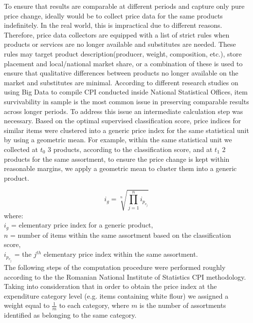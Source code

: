 \documentclass[]{article}
\begin{document}
To ensure that results are comparable at different periods and capture only pure price change, ideally would be to collect price data for the same products indefinitely. In the real world, this is impractical due to different reasons. Therefore, price data collectors are equipped with a list of strict rules when products or services are no longer available and substitutes are needed. These rules may target product description(producer, weight, composition, etc.), store placement and local/national market share, or a combination of these is used to ensure that qualitative differences between products no longer available on the market and substitutes are minimal. According to different research studies on using Big Data to compile CPI conducted inside National Statistical Offices, item survivability in sample is the most common issue in preserving comparable results across longer periods\cite{tranzitivity, kints}. To address this issue an intermediate calculation step was necessary. Based on the optimal supervised classification score, price indices for similar items were clustered into a generic price index for the same statistical unit by using a geometric mean. For example, within the same statistical unit we collected at $t_{0}$ 3 products, according to the classification score, and at $t_{1}$ 2 products for the same assortment, to ensure the price change is kept within reasonable margins, we apply a geometric mean to cluster them into a generic product.   

\begin{equation}\label{eq:3}
i_{g} = \sqrt[n]{\prod_{j=1}^{n} i_{p_{v_{j}}}}
\end{equation}
where:\\
$i_{g}$ = elementary price index for a generic product, \\
$n$ = number of items within the same assortment based on the classification score, \\
$i_{p_{v_{j}}}$ = the $j^{th}$ elementary price index within the same assortment.\\


The following steps of the computation procedure were performed roughly according to the the Romanian National Institute of Statistics CPI methodology.
Taking into consideration that in order to obtain the price index at the expenditure category level (e.g. items containing white flour) we assigned a weight equal to $\frac{1}{m}$ to each category,
where $m$ is the number of assortments identified as belonging to the same category. 
\end{document}
